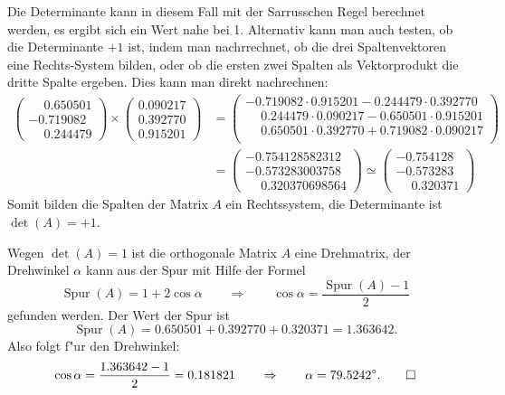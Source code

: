 \begin{loesung}
\begin{teilaufgaben}
Die Determinante kann in diesem Fall mit der Sarrusschen Regel
berechnet werden, es ergibt sich ein Wert nahe bei 1.
Alternativ kann man auch testen, ob die Determinante $+1$ ist,
indem man nachrrechnet, ob die drei Spaltenvektoren eine
Rechts-System bilden, oder ob die ersten zwei Spalten als Vektorprodukt
die dritte Spalte ergeben. Dies kann man direkt nachrechnen:
\begin{align*}
\begin{pmatrix}
\phantom{-}0.650501\\
  -0.719082\\
\phantom{-}0.244479
\end{pmatrix}
\times
\begin{pmatrix}
0.090217\\
0.392770\\
0.915201
\end{pmatrix}
&=
\begin{pmatrix}
-0.719082\cdot 0.915201 - 0.244479\cdot 0.392770\\
\phantom{-}0.244479\cdot 0.090217 - 0.650501\cdot 0.915201\\
\phantom{-}0.650501\cdot 0.392770 + 0.719082\cdot 0.090217\\
\end{pmatrix}
\\
&=
\begin{pmatrix}
%
-0.754128582312\\
-0.573283003758\\
\phantom{-}0.320370698564
\end{pmatrix}
\simeq
\begin{pmatrix}
-0.754128\\
-0.573283\\
\phantom{-}0.320371
\end{pmatrix}
\end{align*}
Somit bilden die Spalten der Matrix $A$ ein Rechtssystem, die Determinante
ist $\det(A)=+1$.
\item Wegen $\det(A)=1$ ist die orthogonale Matrix $A$ eine Drehmatrix,
der Drehwinkel $\alpha$ kann aus der Spur mit Hilfe der Formel
\[
\operatorname{Spur}(A)=1+2\cos\alpha\qquad\Rightarrow\qquad
\cos\alpha=\frac{\operatorname{Spur}(A)-1}2
\]
gefunden werden. Der Wert der Spur ist
\[
\operatorname{Spur}(A) = 0.650501  + 0.392770  + 0.320371 = 1.363642.
\]
Also folgt f"ur den Drehwinkel:
\[
\cos\alpha=\frac{1.363642-1}2= 0.181821\qquad\Rightarrow\qquad
\alpha=79.5242^\circ.
\qedhere
\]
\end{teilaufgaben}
\end{loesung}

